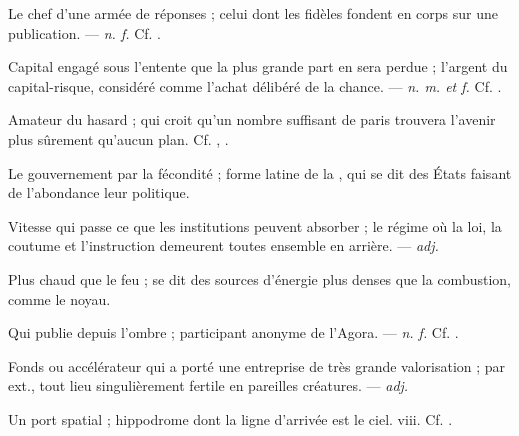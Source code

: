  Le chef d'une armée de réponses ; celui dont les fidèles fondent en corps sur une publication. ---  \textit{n. f.} Cf. .

 Capital engagé sous l'entente que la plus grande part en sera perdue ; l'argent du capital-risque, considéré comme l'achat délibéré de la chance. ---  \textit{n. m. et f.} Cf. .

 Amateur du hasard ; qui croit qu'un nombre suffisant de paris trouvera l'avenir plus sûrement qu'aucun plan. Cf. , .

 Le gouvernement par la fécondité ; forme latine de la , qui se dit des États faisant de l'abondance leur politique.

 Vitesse qui passe ce que les institutions peuvent absorber ; le régime où la loi, la coutume et l'instruction demeurent toutes ensemble en arrière. ---  \textit{adj.}

 Plus chaud que le feu ; se dit des sources d'énergie plus denses que la combustion, comme le noyau. 

 Qui publie depuis l'ombre ; participant anonyme de l'Agora. ---  \textit{n. f.} Cf. .

  Fonds ou accélérateur qui a porté une entreprise de très grande valorisation ; par ext., tout lieu singulièrement fertile en pareilles créatures. ---  \textit{adj.}

 Un port spatial ; hippodrome dont la ligne d'arrivée est le ciel.   viii. Cf. .

